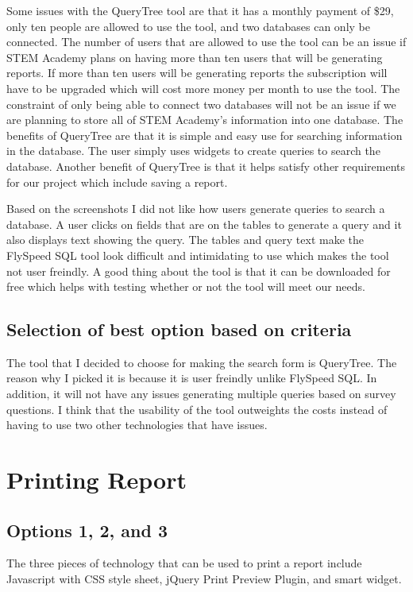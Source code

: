 \documentclass[12pt, draftclsnofoot, onecolumn]{IEEEtran}
\begin{document}
Some issues with the QueryTree tool are that it has a monthly payment of \$29, only ten people are allowed to use the tool, and two databases can only be connected. The number of users that are allowed to use the tool can be an issue if STEM Academy plans on having more than ten users that will be generating reports. If more than ten users will be generating reports the subscription will have to be upgraded which will cost more money per month to use the tool. The constraint of only being able to connect two databases will not be an issue if we are planning to store all of STEM Academy's information into one database. The benefits of QueryTree are that it is simple and easy use for searching information in the database. The user simply uses widgets to create queries to search the database. Another benefit of QueryTree is that it helps satisfy other requirements for our project which include saving a report. 

Based on the screenshots I did not like how users generate queries to search a database. A user clicks on fields that are on the tables to generate a query and it also displays text showing the query. The tables and query text make the FlySpeed SQL tool look difficult and intimidating to use which makes the tool not user freindly. A good thing about the tool is that it can be downloaded for free which helps with testing whether or not the tool will meet our needs. 

\subsection{Selection of best option based on criteria} 
The tool that I decided to choose for making the search form is QueryTree. The reason why I picked it is because it is user freindly unlike FlySpeed SQL. In addition, it will not have any issues generating multiple queries based on survey questions. I think that the usability of the tool outweights the costs instead of having to use two other technologies that have issues. 




\section{Printing Report}

\subsection{Options 1, 2, and 3}
The three pieces of technology that can be used to print a report include Javascript with CSS style sheet, jQuery Print Preview Plugin, and smart widget. 
\end{document}
